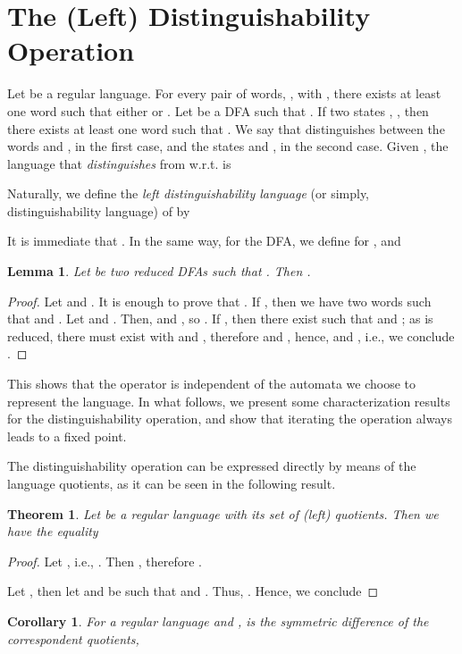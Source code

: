 \documentclass{article}
\newtheorem{lemma}{Lemma}
\newtheorem{theorem}{Theorem}
\newtheorem{corollary}{Corollary}
\newcommand{\dfa}{DFA\xspace}
\newcommand{\dfas}{DFAs\xspace}
\begin{document}
\section{The (Left) Distinguishability Operation}
\label{sgenres}
Let  be a regular language. 
For every pair of words, , with ,
there exists at least one word  such that either 
or . 
Let   be a \dfa such that
.  
If two states , , then there exists at least one
word  such that .  
We say that  distinguishes between the words  and , in the
first case, and the states  and , in the second case. Given , the language that \emph{distinguishes}  from
 w.r.t.  is 


Naturally, we define the 
\emph{left distinguishability language} (or simply, distinguishability language) of  by


It is immediate that .
In the same way, for the \dfa , we define 
for , and 


\begin{lemma}
 Let  be two reduced \dfas such that 
. 
Then .
\end{lemma}
\begin{proof}
Let  and
.  
It is enough to prove that .
If , then we have two words  such that
 and . 
Let  and . 
Then,  and , so . 
If  , then there exist  such that 
 and  ; as  is reduced, 
there must exist  with  and , 
therefore  and ,
 hence,  and , i.e., we conclude .
\end{proof}

This shows that the operator  is independent of the automata
we choose to represent the language. In what follows, we present some characterization results for the
distinguishability operation, and show that iterating the operation
always leads to a fixed point. 

The distinguishability operation can be expressed directly by means of
the language quotients, as it can be seen in the following result. 
\begin{theorem}
\label{theo:dist-quot}
Let  be a regular language with  its set of (left) quotients. Then we have the equality

\end{theorem}
\begin{proof}
Let , i.e.,
 . 
Then , therefore  
. 

Let , then let  and
 be such that  and . Thus, . Hence, we conclude
 
\end{proof}
\begin{corollary}
\label{cor;diffxyquot}
For a regular language  and ,  is 
the symmetric difference of the correspondent quotients, 

\end{corollary}
\end{document}
